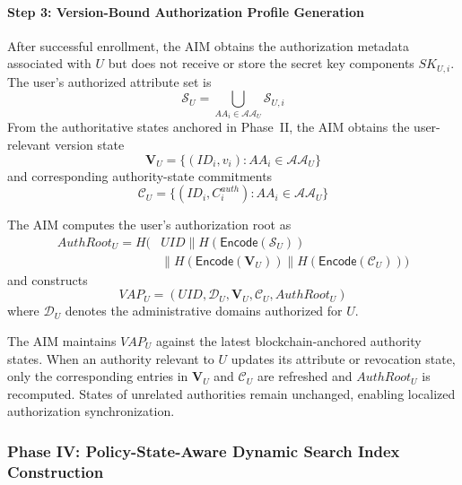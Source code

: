 \documentclass{ieeetj}
\theoremstyle{ieee-style}
\begin{document}
\paragraph*{Step 3: Version-Bound Authorization Profile Generation}

After successful enrollment, the AIM obtains the authorization metadata
associated with $U$ but does not receive or store the secret key
components $SK_{U,i}$. The user's authorized attribute set is
\begin{equation}
\mathcal{S}_U=
\bigcup_{AA_i\in\mathcal{AA}_U}\mathcal{S}_{U,i}
\end{equation}
From the authoritative states anchored in Phase~II, the AIM obtains the
user-relevant version state
\begin{equation}
\mathbf{V}_U=
\{(ID_i,v_i):AA_i\in\mathcal{AA}_U\}
\end{equation}
and corresponding authority-state commitments
\begin{equation}
\mathcal{C}_U=
\{(ID_i,C_i^{auth}):AA_i\in\mathcal{AA}_U\}
\end{equation}

The AIM computes the user's authorization root as
\begin{equation}
\begin{aligned}
AuthRoot_U =
H\!\Big(&UID
\parallel H(\mathsf{Encode}(\mathcal{S}_U))
\\
&\parallel H(\mathsf{Encode}(\mathbf{V}_U))
\parallel H(\mathsf{Encode}(\mathcal{C}_U))
\Big)
\end{aligned}
\end{equation}
and constructs
\begin{equation}
VAP_U=
\left(
UID,
\mathcal{D}_U,
\mathbf{V}_U,
\mathcal{C}_U,
AuthRoot_U
\right)
\end{equation}
where $\mathcal{D}_U$ denotes the administrative domains authorized for
$U$.

The AIM maintains $VAP_U$ against the latest blockchain-anchored
authority states. When an authority relevant to $U$ updates its
attribute or revocation state, only the corresponding entries in
$\mathbf{V}_U$ and $\mathcal{C}_U$ are refreshed and $AuthRoot_U$ is
recomputed. States of unrelated authorities remain unchanged, enabling
localized authorization synchronization.

\subsubsection*{\textbf{Phase IV: Policy-State-Aware Dynamic Search Index
Construction}}
\end{document}
